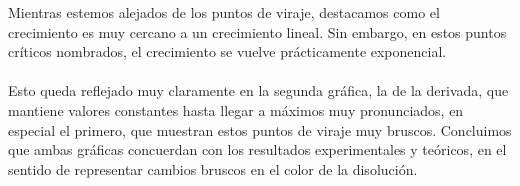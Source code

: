 \noindent Mientras estemos alejados de los puntos de viraje, destacamos como el crecimiento es muy cercano a un crecimiento lineal. Sin embargo, en estos puntos críticos nombrados, el crecimiento se vuelve prácticamente exponencial.\\\\
\noindent Esto queda reflejado muy claramente en la segunda gráfica, la de la derivada, que mantiene valores constantes hasta llegar a máximos muy pronunciados, en especial el primero, que muestran estos puntos de viraje muy bruscos. Concluimos que ambas gráficas concuerdan con los resultados experimentales y teóricos, en el sentido de representar cambios bruscos en el color de la disolución.